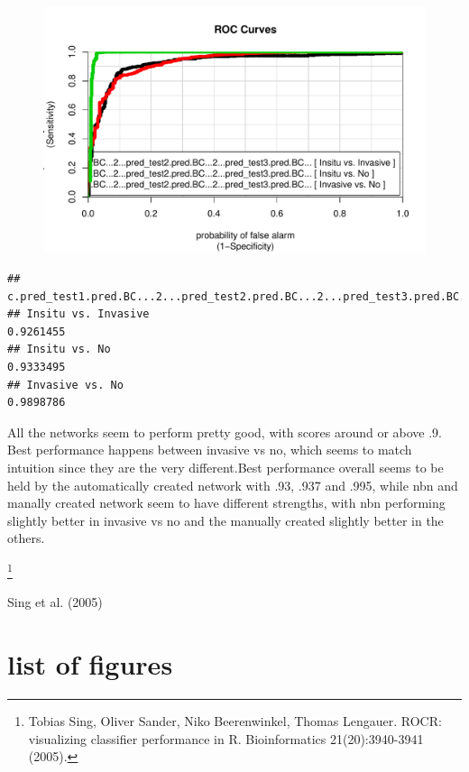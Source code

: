 \documentclass[]{article}
\begin{document}
\begin{figure}[htbp]
\centering
\includegraphics{BN_Ass2_files/figure-latex/unnamed-chunk-14-1.pdf}
\end{figure}

\begin{verbatim}
##                     c.pred_test1.pred.BC...2...pred_test2.pred.BC...2...pred_test3.pred.BC...
## Insitu vs. Invasive                                                                 0.9261455
## Insitu vs. No                                                                       0.9333495
## Invasive vs. No                                                                     0.9898786
\end{verbatim}

All the networks seem to perform pretty good, with scores around or
above .9. Best performance happens between invasive vs no, which seems
to match intuition since they are the very different.Best performance
overall seems to be held by the automatically created network with .93,
.937 and .995, while nbn and manally created network seem to have
different strengths, with nbn performing slightly better in invasive vs
no and the manually created slightly better in the others.

\footnote{Tobias Sing, Oliver Sander, Niko Beerenwinkel, Thomas Lengauer.
ROCR: visualizing classifier performance in R.
Bioinformatics 21(20):3940-3941 (2005). }

\newpage

Sing et al. (2005)

\newpage

\section{list of figures}\label{list-of-figures}
\end{document}
